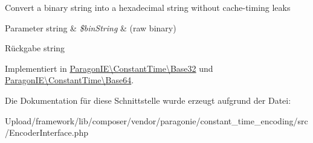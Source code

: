 Convert a binary string into a hexadecimal string without cache-\/timing leaks


\begin{DoxyParams}[1]{Parameter}
string & {\em \$bin\+String} & (raw binary) \\
\hline
\end{DoxyParams}
\begin{DoxyReturn}{Rückgabe}
string 
\end{DoxyReturn}


Implementiert in \mbox{\hyperlink{class_paragon_i_e_1_1_constant_time_1_1_base32_af1ba6da288e869c1e1add91f3301a702}{Paragon\+I\+E\textbackslash{}\+Constant\+Time\textbackslash{}\+Base32}} und \mbox{\hyperlink{class_paragon_i_e_1_1_constant_time_1_1_base64_ac7133a444b198643a07447d558d43669}{Paragon\+I\+E\textbackslash{}\+Constant\+Time\textbackslash{}\+Base64}}.



Die Dokumentation für diese Schnittstelle wurde erzeugt aufgrund der Datei\+:\begin{DoxyCompactItemize}
\item 
Upload/framework/lib/composer/vendor/paragonie/constant\+\_\+time\+\_\+encoding/src/Encoder\+Interface.\+php\end{DoxyCompactItemize}
